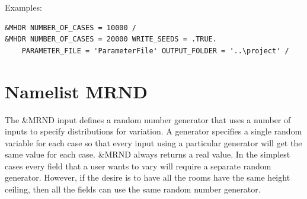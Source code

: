 \documentclass[12pt,twoside]{book}
\begin{document}
\vspace{\baselineskip}
\noindent Examples:
\begin{lstlisting}[language=cdata, basicstyle=\scriptsize]
&MHDR NUMBER_OF_CASES = 10000 /
&MHDR NUMBER_OF_CASES = 20000 WRITE_SEEDS = .TRUE.
	PARAMETER_FILE = 'ParameterFile' OUTPUT_FOLDER = '..\project' /
\end{lstlisting}


\section{Namelist MRND}
\label{info:MRND}

The {\ct \&MRND} input defines a random number generator that uses a number of inputs to specify distributions for variation. A generator specifies a single random variable for each case so that every input using a particular generator will get the same value for each case. {\ct \&MRND} always returns a real value. In the simplest cases every field that a user wants to vary will require a separate random generator. However, if the desire is to have all the rooms have the same height ceiling, then all the fields can use the same random number generator.
\end{document}
